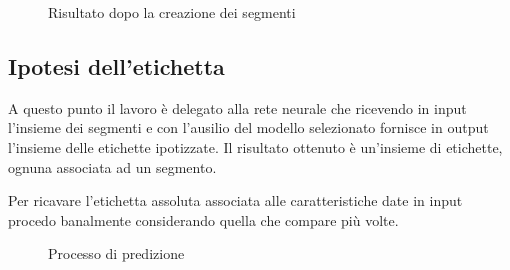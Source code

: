 \begin{figure}[H]
    \centering
    
    \caption{Risultato dopo la creazione dei segmenti}
    \label{fig:segments}
\end{figure}



\subsection{Ipotesi dell'etichetta}
A questo punto il lavoro è delegato alla rete neurale che ricevendo in input l'insieme dei segmenti 
e con l'ausilio del modello selezionato fornisce in output l'insieme delle etichette ipotizzate.
Il risultato ottenuto è un'insieme di etichette, ognuna associata ad un segmento. 

Per ricavare l'etichetta assoluta associata alle caratteristiche date in input procedo banalmente 
considerando quella che compare più volte.

\begin{figure}[H]
    \centering
    
    \caption{Processo di predizione}
    \label{fig:prediction}
\end{figure}

